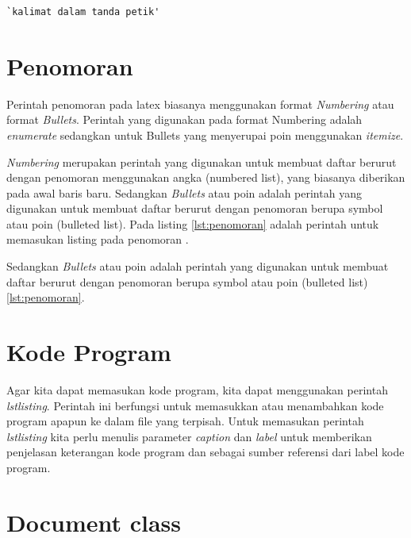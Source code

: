\begin{lstlisting}[caption=Contoh kalimat dalam tanda petik pada Latex,label={lst:tandapetik}]
`kalimat dalam tanda petik'
\end{lstlisting}

\section{Penomoran}
Perintah penomoran pada latex biasanya menggunakan format \textit{Numbering} atau format \textit{Bullets}. Perintah yang digunakan pada format Numbering adalah \textit{enumerate} sedangkan untuk Bullets yang menyerupai poin menggunakan \textit{itemize}.



\textit{Numbering} merupakan perintah yang digunakan untuk membuat daftar berurut dengan penomoran menggunakan angka (numbered list), yang biasanya diberikan pada awal baris baru. Sedangkan \textit{Bullets} atau poin adalah perintah yang digunakan untuk membuat daftar berurut dengan penomoran berupa symbol atau poin (bulleted list). Pada listing \ref{lst:penomoran} adalah perintah untuk memasukan listing pada penomoran .



Sedangkan \textit{Bullets} atau poin adalah perintah yang digunakan untuk membuat daftar berurut dengan penomoran berupa symbol atau poin (bulleted list) \ref{lst:penomoran}.


\section{Kode Program}
Agar kita dapat memasukan kode program, kita dapat menggunakan perintah \textit{lstlisting}. Perintah ini  berfungsi untuk memasukkan atau menambahkan kode program apapun ke dalam file yang terpisah. Untuk memasukan perintah \textit{lstlisting} kita perlu menulis parameter \textit{caption} dan \textit{label} untuk memberikan penjelasan keterangan kode program dan sebagai sumber referensi dari label kode program.



\section{Document class}

